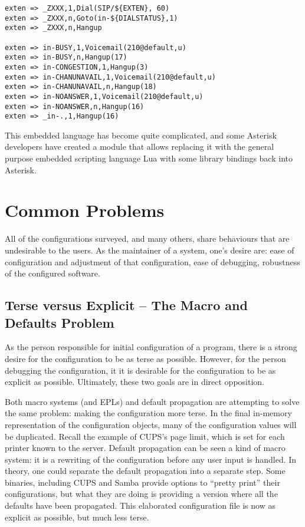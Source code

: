 \documentclass[letterpaper,twocolumn,10pt]{article}
\begin{document}
{\scriptsize
\begin{verbatim}
exten => _ZXXX,1,Dial(SIP/${EXTEN}, 60)
exten => _ZXXX,n,Goto(in-${DIALSTATUS},1)
exten => _ZXXX,n,Hangup

exten => in-BUSY,1,Voicemail(210@default,u)
exten => in-BUSY,n,Hangup(17)
exten => in-CONGESTION,1,Hangup(3)
exten => in-CHANUNAVAIL,1,Voicemail(210@default,u)
exten => in-CHANUNAVAIL,n,Hangup(18)
exten => in-NOANSWER,1,Voicemail(210@default,u)
exten => in-NOANSWER,n,Hangup(16)
exten => _in-.,1,Hangup(16)
\end{verbatim}
}

This embedded language has become quite complicated, and some Asterisk developers have created a module that allows replacing it with the general purpose embedded scripting language Lua with some library bindings back into Asterisk.

\section{Common Problems}
All of the configurations surveyed, and many others, share behaviours that are undesirable to the users. As the maintainer of a system, one's desire are: ease of configuration and adjustment of that configuration, ease of debugging, robustness of the configured software.

\subsection{Terse versus Explicit -- The Macro and Defaults Problem}
As the person responsible for initial configuration of a program, there is a strong desire for the configuration to be as terse as possible. However, for the person debugging the configuration, it it is desirable for the configuration to be as explicit as possible. Ultimately, these two goals are in direct opposition.

Both macro systems (and EPLs) and default propagation are attempting to solve the same problem: making the configuration more terse. In the final in-memory representation of the configuration objects, many of the configuration values will be duplicated. Recall the example of CUPS's page limit, which is set for each printer known to the server. Default propagation can be seen a kind of macro system: it is a rewriting of the configuration before any user input is handled. In theory, one could separate the default propagation into a separate step. Some binaries, including CUPS and Samba provide options to ``pretty print'' their configurations, but what they are doing is providing a version where all the defaults have been propagated. This elaborated configuration file is now as explicit as possible, but much less terse.
\end{document}
